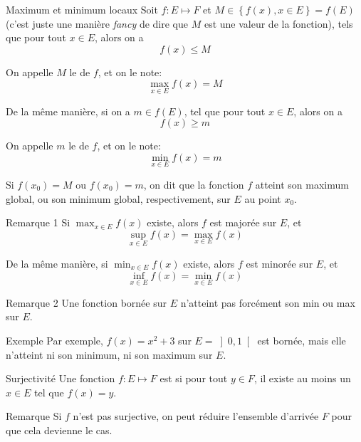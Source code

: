 \documentclass[a4paper]{article}
\begin{document}
\begin{parag}{Maximum et minimum locaux}
    Soit $f: E \mapsto F$ et $M \in \left\{f\left(x\right), x \in E\right\} = f\left(E\right)$ (c'est juste une manière \textit{fancy} de dire que $M$ est une valeur de la fonction), tels que pour tout $x \in E$, alors on a 
    \[f\left(x\right) \leq M\]
    
    On appelle $M$ le  de $f$, et on le note: 
    \[\max_{x \in E} f\left(x\right) = M\]
    
    
    De la même manière, si on a $m \in f\left(E\right)$, tel que pour tout $x \in E$, alors on a 
    \[f\left(x\right) \geq m\]
    
    On appelle $m$ le  de $f$, et on le note:
    \[\min_{x \in E} f\left(x\right) = m\]

    Si $f\left(x_0\right) = M$ ou $f\left(x_0\right) = m$, on dit que la fonction $f$ atteint son maximum global, ou son minimum global, respectivement, sur $E$ au point $x_0$.
\end{parag}

\begin{parag}{Remarque 1}
    Si $\max_{x \in E} f\left(x\right)$ existe, alors $f$ est majorée sur $E$, et 
    \[\sup_{x \in E} f\left(x\right) = \max_{x \in E} f\left(x\right)\]

    De la même manière, si $\min_{x \in E} f\left(x\right)$ existe, alors $f$ est minorée sur $E$, et 
    \[\inf_{x \in E} f\left(x\right) = \min_{x \in E} f\left(x\right)\]
\end{parag}

\begin{parag}{Remarque 2}
    Une fonction bornée sur $E$ n'atteint pas forcément son min ou max sur $E$. 

    \begin{subparag}{Exemple}
        Par exemple, $f\left(x\right) = x^2 + 3$ sur $E = \left]0,1\right[ $ est bornée, mais elle n'atteint ni son minimum, ni son maximum sur $E$.
    \end{subparag}
\end{parag}

\begin{parag}{Surjectivité}
    Une fonction $f: E \mapsto F$ est  si pour tout $y \in F$, il existe au moins un $x \in E$ tel que $f\left(x\right) = y$.

    \begin{subparag}{Remarque}
        Si $f$ n'est pas surjective, on peut réduire l'ensemble d'arrivée $F$ pour que cela devienne le cas.
    \end{subparag}
\end{parag}
\end{document}
